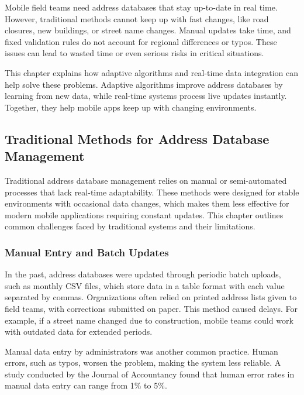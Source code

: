 \Author{\daAuthorOne}

Mobile field teams need address databases that stay up-to-date in real time. However, traditional methods cannot keep up with fast changes, like road closures, new buildings, or street name changes. Manual updates take time, and fixed validation rules do not account for regional differences or typos. These issues can lead to wasted time or even serious risks in critical situations.\blankLine

This chapter explains how adaptive algorithms and real-time data integration can help solve these problems. Adaptive algorithms improve address databases by learning from new data, while real-time systems process live updates instantly. Together, they help mobile apps keep up with changing environments.


    \subsection{Traditional Methods for Address Database Management}

    Traditional address database management relies on manual or semi-automated processes that lack real-time adaptability. These methods were designed for stable environments with occasional data changes, which makes them less effective for modern mobile applications requiring constant updates. This chapter outlines common challenges faced by traditional systems and their limitations.


        \subsubsection{Manual Entry and Batch Updates}
        In the past, address databases were updated through periodic batch uploads, such as monthly CSV files, which store data in a table format with each value separated by commas. Organizations often relied on printed address lists given to field teams, with corrections submitted on paper. This method caused delays. For example, if a street name changed due to construction, mobile teams could work with outdated data for extended periods. \autocite{FasterCapital2025Mar}\blankLine


        Manual data entry by administrators was another common practice. Human errors, such as typos, worsen the problem, making the system less reliable. A study conducted by the Journal of Accountancy found that human error rates in manual data entry can range from 1\% to 5\%. \autocite{integrationmadeeasy2025Mar}


